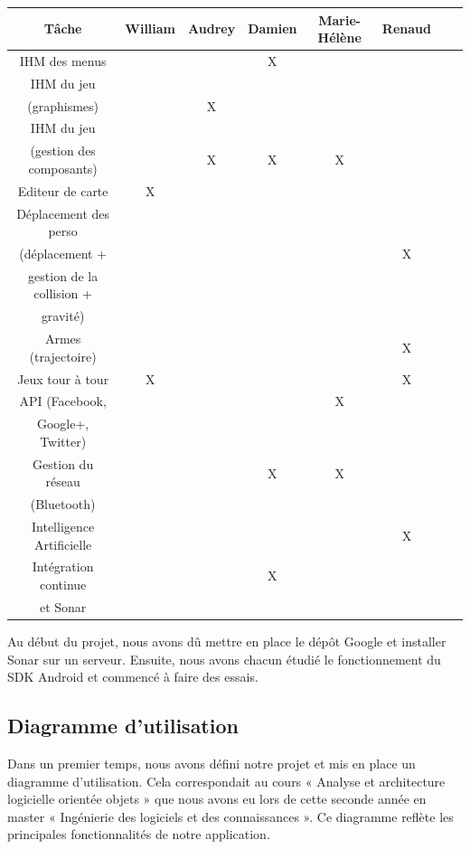 \documentclass{report}
\begin{document}
\begin{tabular}{|c|c|c|c|c|c|c|c|}
\hline
{\bf Tâche } & {\bf William } & {\bf Audrey } & {\bf Damien } & {\bf Marie-Hélène } & {\bf Renaud }\\
\hline
{IHM des menus} & {} & {} & {X} & {} & {}\\
\hline
{IHM du jeu} & {} & {} & {} & {} & {} \\
{(graphismes)} & {} & {X} & {} & {} & {} \\
\hline
{IHM du jeu} & {} & {} & {} & {} & {}\\
{(gestion des composants)} & {} & {X} & {X} & {X} & {} \\
\hline
{Editeur de carte} & {X} & {} & {} & {} & {} \\
\hline
Déplacement des perso &&&&&\\
(déplacement + &&&&& X\\
gestion de la collision + &&&&&\\
 gravité) &&&&&\\
\hline
{Armes (trajectoire)} & {} & {} & {} & {} & {X} \\
\hline
{Jeux tour à tour} & {X} & {} & {} & {} & {X} \\
\hline
{API (Facebook,} & {} & {} & {} & {X} & {} \\
{ Google+, Twitter)} & {} & {} & {} & {} & {} \\
\hline
{Gestion du réseau} & {} & {} & {X} & {X} & {} \\
{(Bluetooth)} & {} & {} & {} & {} & {} \\
\hline
{Intelligence Artificielle} & {} & {} & {} & {} & {X}\\
\hline
{Intégration continue} & {} & {} & {X} & {} & {}\\
{et Sonar} & {} & {} & {} & {} & {}\\
\hline
\end{tabular}
\bigskip


Au début du projet, nous avons dû mettre en place le dépôt Google et
installer Sonar sur un serveur. Ensuite, nous avons chacun étudié le
fonctionnement du SDK Android et commencé à faire des essais.

\subsection{Diagramme d’utilisation}
\bigskip


Dans un premier temps, nous avons défini notre projet et mis en place un
diagramme d’utilisation. Cela correspondait au cours « Analyse et
architecture logicielle orientée objets » que nous avons eu lors de cette
seconde année en master « Ingénierie des logiciels et des
connaissances ». Ce diagramme reflète les principales fonctionnalités
de notre application.
\end{document}
